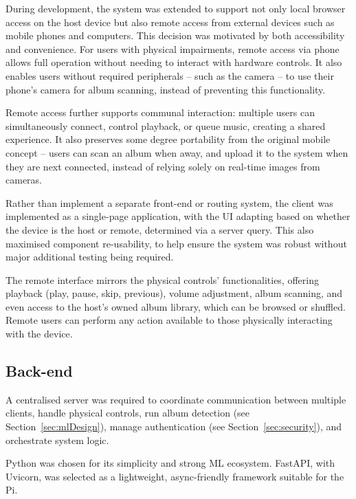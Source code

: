                 During development, the system was extended to support not only local browser access on the host device but also remote access from external devices such as mobile phones and computers. This decision was motivated by both accessibility and convenience. For users with physical impairments, remote access via phone allows full operation without needing to interact with hardware controls. It also enables users without required peripherals -- such as the camera -- to use their phone’s camera for album scanning, instead of preventing this functionality.
    
                Remote access further supports communal interaction: multiple users can simultaneously connect, control playback, or queue music, creating a shared experience. It also preserves some degree portability from the original mobile concept -- users can scan an album when away, and upload it to the system when they are next connected, instead of relying solely on real-time images from cameras.
                
                Rather than implement a separate front-end or routing system, the client was implemented as a single-page application, with the UI adapting based on whether the device is the host or remote, determined via a server query. This also maximised component re-usability, to help ensure the system was robust without major additional testing being required.
                
                The remote interface mirrors the physical controls' functionalities, offering playback (play, pause, skip, previous), volume adjustment, album scanning, and even access to the host's owned album library, which can be browsed or shuffled. Remote users can perform any action available to those physically interacting with the device.
    
        
        \subsection{Back-end}
    
            A centralised server was required to coordinate communication between multiple clients, handle physical controls, run album detection (see Section~\ref{sec:mlDesign}), manage authentication (see Section~\ref{sec:security}), and orchestrate system logic.
    
            Python was chosen for its simplicity and strong ML ecosystem. FastAPI, with Uvicorn, was selected as a lightweight, async-friendly framework suitable for the Pi.
    
